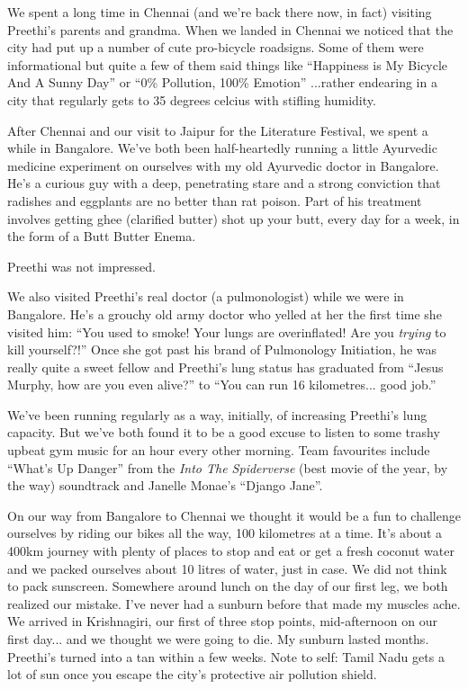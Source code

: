 \documentclass{article}
\begin{document}
We spent a long time in Chennai (and we're back there now, in fact) visiting
Preethi's parents and grandma. When we landed in Chennai we noticed that the city had
put up a number of cute pro-bicycle roadsigns. Some of them were informational but
quite a few of them said things like ``Happiness is My Bicycle And A Sunny Day'' or
``0\% Pollution, 100\% Emotion'' ...rather endearing in a city that regularly gets to
35 degrees celcius with stifling humidity.

After Chennai and our visit to Jaipur for the Literature Festival, we spent a while
in Bangalore. We've both been half-heartedly running a little Ayurvedic medicine
experiment on ourselves with my old Ayurvedic doctor in Bangalore. He's a curious guy
with a deep, penetrating stare and a strong conviction that radishes and eggplants
are no better than rat poison. Part of his treatment involves getting ghee (clarified
butter) shot up your butt, every day for a week, in the form of a Butt Butter Enema.

Preethi was not impressed.

We also visited Preethi's real doctor (a pulmonologist) while we were in
Bangalore. He's a grouchy old army doctor who yelled at her the first time she
visited him: ``You used to smoke! Your lungs are overinflated! Are you
\textit{trying} to kill yourself?!'' Once she got past his brand of Pulmonology
Initiation, he was really quite a sweet fellow and Preethi's lung status has
graduated from ``Jesus Murphy, how are you even alive?'' to ``You can run 16
kilometres... good job.''

We've been running regularly as a way, initially, of increasing Preethi's lung
capacity. But we've both found it to be a good excuse to listen to some trashy upbeat
gym music for an hour every other morning. Team favourites include ``What's Up
Danger'' from the \textit{Into The Spiderverse} (best movie of the year, by the way)
soundtrack and Janelle Monae's ``Django Jane''.

On our way from Bangalore to Chennai we thought it would be a fun to challenge
ourselves by riding our bikes all the way, 100 kilometres at a time. It's about a
400km journey with plenty of places to stop and eat or get a fresh coconut water and
we packed ourselves about 10 litres of water, just in case. We did not think to pack
sunscreen. Somewhere around lunch on the day of our first leg, we both realized our
mistake. I've never had a sunburn before that made my muscles ache. We arrived in
Krishnagiri, our first of three stop points, mid-afternoon on our first day... and we
thought we were going to die. My sunburn lasted months. Preethi's turned into a tan
within a few weeks. Note to self: Tamil Nadu gets a lot of sun once you escape the
city's protective air pollution shield.
\end{document}
